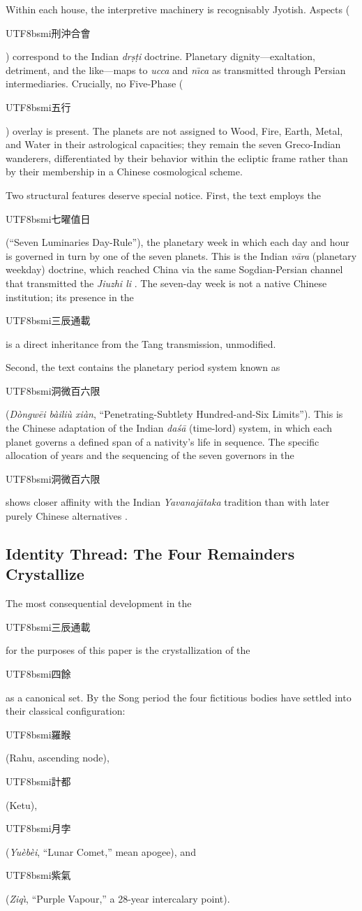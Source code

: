 \documentclass[10pt,a4paper]{article}
\newcommand{\zh}[1]{\begin{CJK}{UTF8}{bsmi}#1\end{CJK}}
\begin{document}
Within each house, the interpretive machinery is recognisably Jyotish.
Aspects (\zh{刑沖合會}) correspond to the Indian \textit{dr\d{s}\d{t}i}
doctrine.  Planetary dignity---exaltation, detriment, and the like---maps
to \textit{ucca} and \textit{n\={\i}ca} as transmitted through Persian
intermediaries.  Crucially, no Five-Phase (\zh{五行}) overlay is present.
The planets are not assigned to Wood, Fire, Earth, Metal, and Water in
their astrological capacities; they remain the seven Greco-Indian wanderers,
differentiated by their behavior within the ecliptic frame rather than by
their membership in a Chinese cosmological scheme.

Two structural features deserve special notice.  First, the text employs
the \zh{七曜值日} (``Seven Luminaries Day-Rule''), the planetary week in
which each day and hour is governed in turn by one of the seven planets.
This is the Indian \textit{v\={a}ra} (planetary weekday) doctrine, which
reached China via the same Sogdian-Persian channel that transmitted the
\textit{Jiuzhi li} \citep{mak2024persian}.  The seven-day week is not
a native Chinese institution; its presence in the \zh{三辰通載} is a
direct inheritance from the Tang transmission, unmodified.

Second, the text contains the planetary period system known as
\zh{洞微百六限} (\textit{D\`ongw\=ei b\`aili\`u xi\`an},
``Penetrating-Subtlety Hundred-and-Six Limits'').  This is the Chinese
adaptation of the Indian \textit{da\'{s}\={a}} (time-lord) system, in which
each planet governs a defined span of a nativity's life in sequence.
The specific allocation of years and the sequencing of the seven governors
in the \zh{洞微百六限} shows closer affinity with the Indian
\textit{Yavanaj\={a}taka} tradition than with later purely Chinese
alternatives \citep{ho2003astrology}.

\subsection*{Identity Thread: The Four Remainders Crystallize}

The most consequential development in the \zh{三辰通載} for the purposes
of this paper is the crystallization of the \zh{四餘} as a canonical set.
By the Song period the four fictitious bodies have settled into their
classical configuration: \zh{羅睺} (Rahu, ascending node), \zh{計都}
(Ketu), \zh{月孛} (\textit{Yu\`eb\`ei}, ``Lunar Comet,'' mean apogee),
and \zh{紫氣} (\textit{Ziq\`{\i}}, ``Purple Vapour,'' a 28-year
intercalary point).
\end{document}
